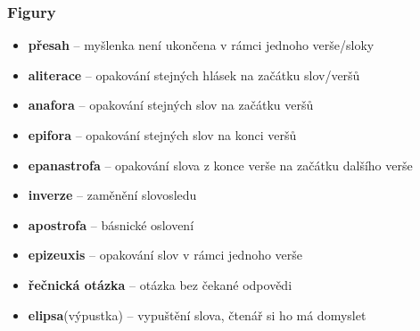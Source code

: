 \documentclass[10pt,a4paper]{article}
\begin{document}
\subsubsection{Figury}
\begin{itemize}
\item[] \textbf{přesah} -- myšlenka není ukončena v rámci jednoho verše/sloky
\item[] \textbf{aliterace} -- opakování stejných hlásek na začátku slov/veršů
\item[] \textbf{anafora} -- opakování stejných slov na začátku veršů
\item[] \textbf{epifora} -- opakování stejných slov na konci veršů
\item[] \textbf{epanastrofa} -- opakování slova z konce verše na začátku dalšího verše
\item[] \textbf{inverze} -- zaměnění slovosledu
\item[] \textbf{apostrofa} -- básnické oslovení
\item[] \textbf{epizeuxis} -- opakování slov v rámci jednoho verše
\item[] \textbf{řečnická otázka} -- otázka bez čekané odpovědi
\item[] \textbf{elipsa}(výpustka) -- vypuštění slova, čtenář si ho má domyslet
\end{itemize}
\end{document}
